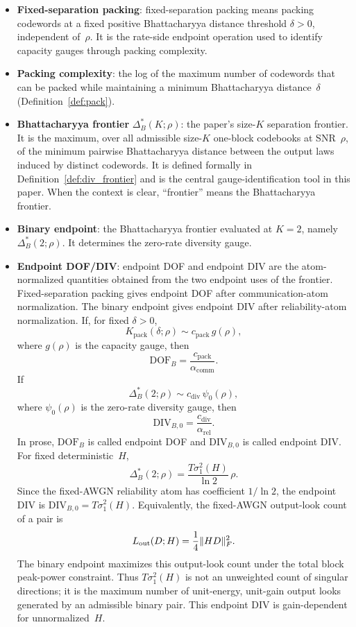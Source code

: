 \documentclass[lettersize,onecolumn]{IEEEtran}
\newcommand{\snr}{\rho}
\begin{document}
\begin{itemize}
\item \textbf{Fixed-separation packing}: fixed-separation packing
means packing codewords at a fixed positive Bhattacharyya distance
threshold $\delta > 0$, independent of~$\snr$. It is the rate-side
endpoint operation used to identify capacity gauges through packing
complexity.

\item \textbf{Packing complexity}: the log of the maximum number of
codewords that can be packed while maintaining a minimum
Bhattacharyya distance~$\delta$
(Definition~\ref{def:pack}).

\item \textbf{Bhattacharyya frontier}
$\Delta_B^*(K;\snr)$: the paper's size-$K$ separation frontier. It is
the maximum, over all admissible size-$K$ one-block codebooks at
SNR~$\snr$, of the minimum pairwise Bhattacharyya distance between the
output laws induced by distinct codewords. It is defined formally in
Definition~\ref{def:div_frontier} and is the central
gauge-identification tool in this paper. When the context is clear,
``frontier'' means the Bhattacharyya frontier.

\item \textbf{Binary endpoint}: the Bhattacharyya frontier evaluated
at $K=2$, namely $\Delta_B^*(2;\snr)$. It determines the zero-rate
diversity gauge.

\item \textbf{Endpoint DOF/DIV}: endpoint DOF and endpoint DIV are
the atom-normalized quantities obtained from the two endpoint uses of
the frontier. Fixed-separation packing gives endpoint DOF after
communication-atom normalization. The binary endpoint gives endpoint
DIV after reliability-atom normalization. If, for fixed $\delta > 0$,
\[
  K_{\mathrm{pack}}(\delta;\snr) \sim c_{\mathrm{pack}}\,g(\snr),
\]
where $g(\snr)$ is the capacity gauge, then
\[
  \mathrm{DOF}_B = \frac{c_{\mathrm{pack}}}{\alpha_{\mathrm{comm}}}.
\]
If
\[
  \Delta_B^*(2;\snr) \sim c_{\mathrm{div}}\,\psi_0(\snr),
\]
where $\psi_0(\snr)$ is the zero-rate diversity gauge, then
\[
  \mathrm{DIV}_{B,0}
  = \frac{c_{\mathrm{div}}}{\alpha_{\mathrm{rel}}}.
\]
In prose, $\mathrm{DOF}_B$ is called endpoint DOF and
$\mathrm{DIV}_{B,0}$ is called endpoint DIV.
For fixed deterministic~$H$,
\[
  \Delta_B^*(2;\snr)
  = \frac{T\sigma_1^2(H)}{\ln 2}\,\snr.
\]
Since the fixed-AWGN reliability atom has coefficient $1/\ln 2$, the
endpoint DIV is $\mathrm{DIV}_{B,0} = T\sigma_1^2(H)$.
Equivalently, the fixed-AWGN output-look count of a pair is
\[
L_{\rm out}(D;H)=\frac{1}{4}\|HD\|_F^2.
\]
The binary endpoint maximizes this output-look count under the total
block peak-power constraint. Thus $T\sigma_1^2(H)$ is not an
unweighted count of singular directions; it is the maximum number of
unit-energy, unit-gain output looks generated by an admissible binary
pair.
This endpoint DIV is gain-dependent for unnormalized~$H$.


\end{itemize}
\end{document}
